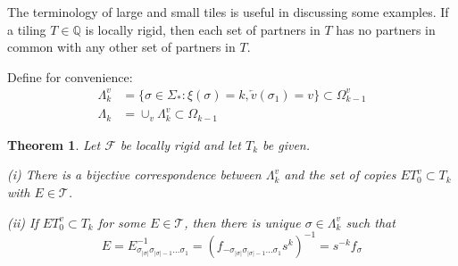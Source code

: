 \documentclass{amsproc}
\newtheorem{theorem}{Theorem}
\theoremstyle{plain}
\theoremstyle{definition}
\numberwithin{equation}{section}
\begin{document}
The terminology of large and small tiles is useful in discussing some
examples. If a tiling $T\in\mathbb{Q}$ is locally rigid, then each set of
partners in $T$ has no partners in common with any other set of partners in $%
T$.

Define for convenience: 
\begin{align*}
\Lambda_{k}^{v} & =\{\sigma\in\Sigma_{\ast}:\xi(\sigma)=k,\overleftarrow{v}%
(\sigma_{1})=v\}\subset\Omega_{k-1}^{v} \\
\Lambda_{k} & =\cup_{v}\Lambda_{k}^{v}\subset\Omega_{k-1}
\end{align*}

\begin{theorem}
\label{keythm}Let $\mathcal{F}$ be locally rigid and let $T_{k}$ be given.

(i) There is a bijective correspondence between $\Lambda_{k}^{v}$ and the
set of copies $ET_{0}^{v}\subset T_{k}$ with $E\in\mathcal{T}$.

(ii) If $ET_{0}^{v}\subset T_{k}$ for some $E\in\mathcal{T}$, then there is
unique $\sigma\in\Lambda_{k}^{v}$ such that 
\begin{equation*}
E=E_{\sigma_{\left\vert \sigma\right\vert }\sigma_{\left\vert \sigma
\right\vert -1}...\sigma_{1}}^{-1}=(f_{-\sigma_{\left\vert \sigma\right\vert
}\sigma_{\left\vert \sigma\right\vert
-1}...\sigma_{1}}s^{k})^{-1}=s^{-k}f_{\sigma}
\end{equation*}
\end{theorem}
\end{document}
